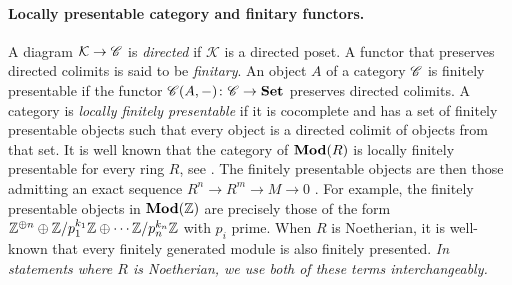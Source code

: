 \documentclass[runningheads]{llncs}
\begin{document}
\paragraph*{Locally presentable category and finitary functors.}
 A diagram $\mathcal K \to \mathscr{C}$ is \emph{directed} if $\mathcal K$ is a directed poset. A functor that  preserves directed colimits is said to be \emph{finitary}. An object $A$ of a category $\mathscr{C}$ is finitely presentable if the functor $\mathscr{C}(A, -) \colon \mathscr{C} \to  \mathbf{Set}$ preserves directed colimits. A category is \emph{locally finitely presentable} if it is cocomplete and has a set of finitely presentable objects such that every object is a directed colimit of objects from that set.  It is well known that the category of $\operatorname{\mathbf{Mod}}(R)$ is locally finitely presentable for every ring $R$, see \cite[3.5(2)]{ademek94}. The finitely presentable objects are then those admitting an exact sequence $R^n \to R^m \to M \to 0$ \cite{AdamekEA19}. For example,  the finitely presentable objects in $\operatorname{\mathbf{Mod}}(\mathbb{Z})$ are precisely those of the form $\mathbb{Z}^{\oplus n} \oplus \mathbb{Z}/p_1^{k_1}\mathbb{Z} \oplus \cdots \mathbb{Z}/p_n^{k_n}\mathbb{Z} $ with $p_i$ prime. When $R$ is Noetherian, it is well-known that every finitely generated module is also finitely presented.  \emph{In statements where $R$ is Noetherian, we use both of these terms interchangeably.}

 
\end{document}
